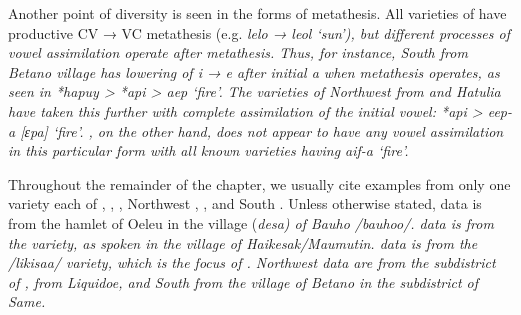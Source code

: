 Another point of diversity is seen in the forms of metathesis.
All varieties of  have productive CV → VC metathesis (e.g.
\it{lelo → leol} ‘sun’),
but different processes of  vowel assimilation operate after metathesis.
Thus, for instance, South  from Betano village has lowering
of \it{i → e} after initial \it{a} when metathesis operates,
as seen in *hapuy > *api > \it{aep} ‘fire’.
The varieties of Northwest  from 
and Hatulia have taken this further with complete assimilation
of the initial vowel: *api > \it{eep-a} [ɛpa] ‘fire’.
 , on the other hand,
does not appear to have any vowel assimilation in this particular
form with all known varieties having \it{aif-a} ‘fire’.

Throughout the remainder of the chapter,
we usually cite examples from only one variety each of ,
, , Northwest ,  , and South .
Unless otherwise stated,  data is from the hamlet of Oele{\Q}u
in the village (\it{desa}) of Bauho /bauhoo/.
 data is from the  variety,
as spoken in the village of Haikesak/Maumutin.
 data is from the  /likisaa/ variety, which is
the focus of \citet{LSG2006}.
Northwest  data are from the subdistrict of ,
  from Liquidoe,
and South  from the village of Betano in the subdistrict of Same.
